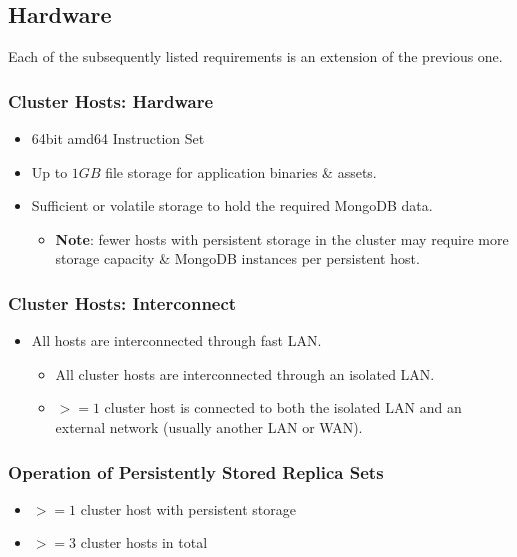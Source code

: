 \documentclass[a4paper, 11pt]{article}
\begin{document}
\subsection{Hardware}
Each of the subsequently listed requirements is an extension of the previous one.
\subsubsection{Cluster Hosts: Hardware}
\begin{itemize}
	\item 64bit amd64 Instruction Set
	\item Up to $1GB$ file storage for \mamid application binaries \& assets.
	\item Sufficient  or \gls{volatile storage} to hold the required \gls{MongoDB} data. \\
	\begin{itemize}
		\item \textbf{Note}: fewer \glspl{host} with \gls{persistent storage} in the cluster may require more storage capacity \& \gls{MongoDB} instances per persistent host.
	\end{itemize}
\end{itemize}

\subsubsection{Cluster Hosts: Interconnect}
\begin{itemize}
	\item All hosts are interconnected through fast \acrshort{LAN}.
	\begin{itemize}
		\item All cluster hosts are interconnected through an isolated \acrshort{LAN}.
		\item $>= 1$ cluster host is connected to both the isolated \acrshort{LAN} and an external network (usually another \acrshort{LAN} or \acrshort{WAN}).
	\end{itemize}
\end{itemize}

\subsubsection{Operation of Persistently Stored Replica Sets}
\begin{itemize}
	\item $>= 1$ cluster host with \gls{persistent storage}
	\item $>= 3$ cluster hosts in total
\end{itemize}
\end{document}
